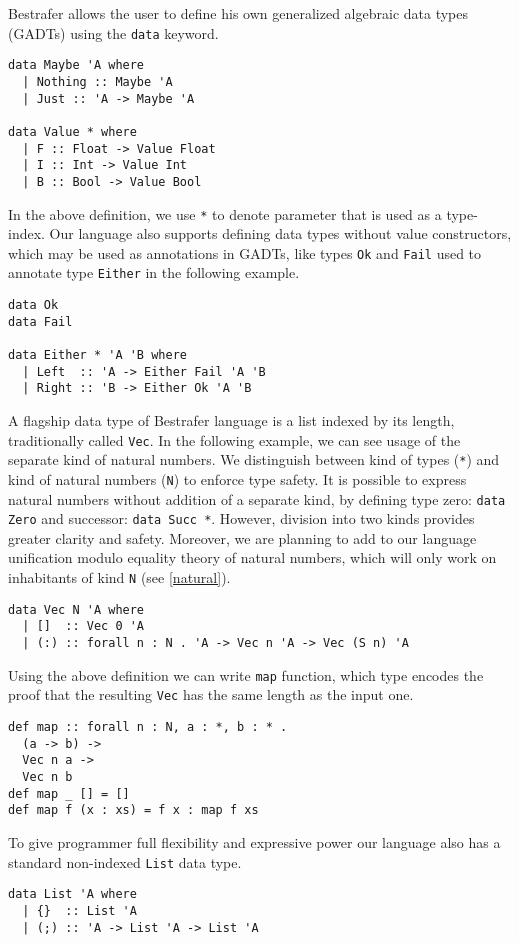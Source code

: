 \documentclass[declaration,shortabstract,english]{iithesis}
\begin{document}
Bestrafer allows the user to define his own generalized algebraic data types (GADTs)
using the \verb+data+ keyword.
\begin{verbatim}
data Maybe 'A where
  | Nothing :: Maybe 'A
  | Just :: 'A -> Maybe 'A

data Value * where
  | F :: Float -> Value Float
  | I :: Int -> Value Int
  | B :: Bool -> Value Bool
\end{verbatim}
In the above definition, we use \verb+*+ to denote parameter that is used as a type-index.
Our language also supports defining data types without value constructors, which may be used as annotations in GADTs,
like types \verb+Ok+ and \verb+Fail+ used to annotate type \verb+Either+ in the following example.
\begin{verbatim}
data Ok
data Fail

data Either * 'A 'B where
  | Left  :: 'A -> Either Fail 'A 'B
  | Right :: 'B -> Either Ok 'A 'B
\end{verbatim}
A flagship data type of Bestrafer language is a list indexed by its length, traditionally called \verb+Vec+.
In the following example, we can see usage of the separate kind of natural numbers. We distinguish between
kind of types (\verb+*+) and kind of natural numbers (\verb+N+) to enforce type safety. It is possible to express
natural numbers without addition of a separate kind, by defining type zero: \verb+data Zero+ and successor: \verb+data Succ *+.
However, division into two kinds provides greater clarity and safety. Moreover, we are planning to add to our language
unification modulo equality theory of natural numbers, which will only work on inhabitants of kind \verb+N+ (see \cref{natural}).
\begin{verbatim}
data Vec N 'A where
  | []  :: Vec 0 'A
  | (:) :: forall n : N . 'A -> Vec n 'A -> Vec (S n) 'A
\end{verbatim}
Using the above definition we can write \verb+map+ function, which type encodes the proof that the resulting \verb+Vec+ has the same
length as the input one.
\begin{verbatim}
def map :: forall n : N, a : *, b : * .
  (a -> b) ->
  Vec n a ->
  Vec n b
def map _ [] = []
def map f (x : xs) = f x : map f xs
\end{verbatim}
To give programmer full flexibility and expressive power our language also has a standard non-indexed \verb+List+ data type.
\begin{verbatim}
data List 'A where
  | {}  :: List 'A
  | (;) :: 'A -> List 'A -> List 'A
\end{verbatim}
\end{document}

